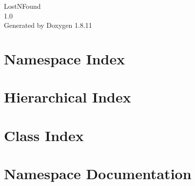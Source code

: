 \documentclass[twoside]{book}
\newcommand{\+}{\discretionary{\mbox{\scriptsize$\hookleftarrow$}}{}{}}
\newcommand{\clearemptydoublepage}{%
  \newpage{\pagestyle{empty}\cleardoublepage}%
}
\begin{document}
\hypersetup{pageanchor=false,
             bookmarksnumbered=true,
             pdfencoding=unicode
            }
\begin{titlepage}
\vspace*{7cm}
\begin{center}%
{\Large Lost\+N\+Found \\[1ex]\large 1.\+0 }\\
\vspace*{1cm}
{\large Generated by Doxygen 1.8.11}\\
\end{center}
\end{titlepage}
\clearemptydoublepage
\tableofcontents
\clearemptydoublepage
{}
\hypersetup{pageanchor=true}

\chapter{Namespace Index}

\chapter{Hierarchical Index}

\chapter{Class Index}

\chapter{Namespace Documentation}

\end{document}
